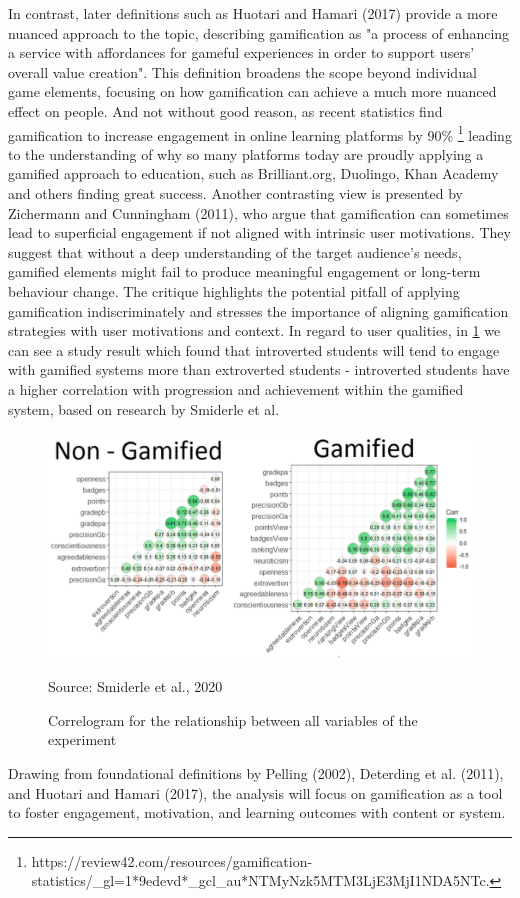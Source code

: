 In contrast, later definitions such as Huotari and Hamari (2017) provide a more nuanced approach to the topic, describing gamification as "a process of enhancing a service with affordances for gameful experiences in order to support users' overall value creation"\cite{redefinition}.
This definition broadens the scope beyond individual game elements, focusing on how gamification can achieve a much more nuanced effect on people. 
And not without good reason, as recent statistics find gamification to increase engagement in online learning platforms by 90\% \footnote{https://review42.com/resources/gamification-statistics/\_gl=1*9edevd*\_gcl\_au*NTMyNzk5MTM3LjE3MjI1NDA5NTc.} leading to the understanding of why so many platforms today are proudly applying a gamified approach to education, such as Brilliant.org, Duolingo, Khan Academy and others finding great success. 
Another contrasting view is presented by Zichermann and Cunningham (2011), who argue that gamification can sometimes lead to superficial engagement if not aligned with intrinsic user motivations. 
They suggest that without a deep understanding of the target audience's needs, gamified elements might fail to produce meaningful engagement or long-term behaviour change\cite{bookOnEngagement}. 
The critique highlights the potential pitfall of applying gamification indiscriminately and stresses the importance of aligning gamification strategies with user motivations and context. In regard to user qualities, in \ref{fig:gamifiedVSnongamified} we can see a study result which found that introverted students will tend to engage with gamified systems more than extroverted students - introverted students have a higher correlation with progression and achievement within the gamified system, based on research by Smiderle et al\cite{gamifiedChart}.\\
\begin{figure}[htbp]
 \centering
 \includegraphics[width=\textwidth]{Media/chart.png}
 \caption{Correlogram for the relationship between all variables of the experiment}
 \label{fig:gamifiedVSnongamified}
 {\raggedright \small{Source: Smiderle et al., 2020}\par}
\end{figure}
Drawing from foundational definitions by Pelling (2002), Deterding et al. (2011), and Huotari and Hamari (2017), the analysis will focus on gamification as a tool to foster engagement, motivation, and learning outcomes with content or system.

